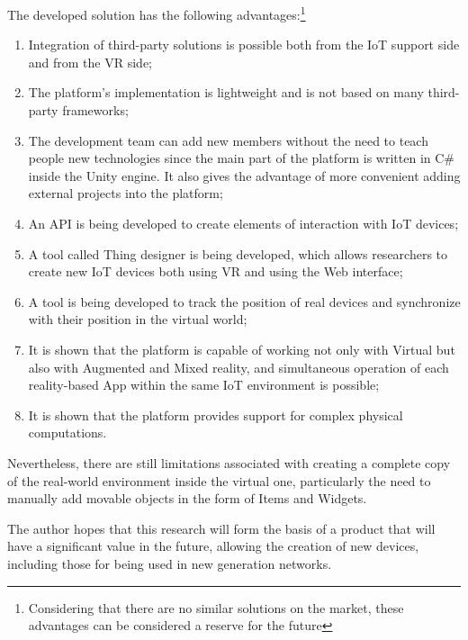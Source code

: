 The developed solution has the following advantages:\footnote{Considering that there are no similar solutions on the market, these advantages can be considered a reserve for the future}
\begin{enumerate}
    \item Integration of third-party solutions is possible both from the IoT support side and from the VR side;
    \item The platform's implementation is lightweight and is not based on many third-party frameworks;
    \item The development team can add new members without the need to teach people new technologies since the main part of the platform is written in C\# inside the Unity engine. It also gives the advantage of more convenient adding external projects into the platform;
    \item An API is being developed to create elements of interaction with IoT devices;
    \item A tool called Thing designer is being developed, which allows researchers to create new IoT devices both using VR and using the Web interface;
    \item A tool is being developed to track the position of real devices and synchronize with their position in the virtual world;
    \item It is shown that the platform is capable of working not only with Virtual but also with Augmented and Mixed reality, and simultaneous operation of each reality-based App within the same IoT environment is possible;
    \item It is shown that the platform provides support for complex physical computations.
\end{enumerate}

Nevertheless, there are still limitations associated with creating a complete copy of the real-world environment inside the virtual one, particularly the need to manually add movable objects in the form of Items and Widgets.

The author hopes that this research will form the basis of a product that will have a significant value in the future, allowing the creation of new devices, including those for being used in new generation networks.